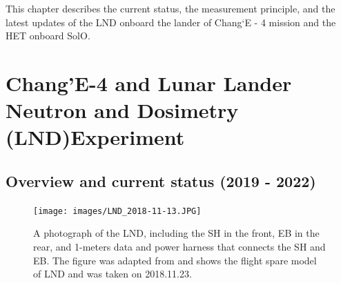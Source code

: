 This chapter describes the current status, the measurement principle, and the latest updates of the \ac{LND} onboard the lander of Chang`E - 4 mission and the \ac{HET} onboard \ac{SolO}. 

\section{Chang'E-4 and Lunar Lander Neutron and Dosimetry (LND)Experiment}
\label{sec:change_4_LND}

\subsection*{Overview and current status (2019 - 2022)}

\begin{figure}
    \centering
    \texttt{[image: images/LND\_2018-11-13.JPG]}
    \caption[A photograph of the \ac{LND}]{A photograph of the \ac{LND}, including the \ac{SH} in the front, \ac{EB} in the rear, and 1-meters data and power harness that connects the \ac{SH} and \ac{EB}. The figure was adapted from \citet{Wimmer2020SSRv} and shows the flight spare model of LND and was taken on 2018.11.23.}
    \label{Fig:LND_instrument}
\end{figure}


